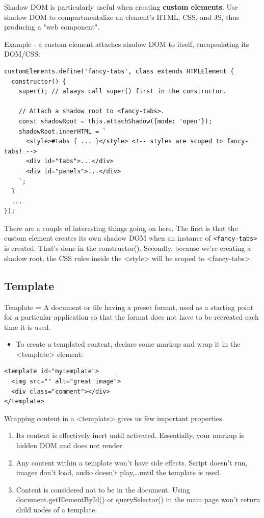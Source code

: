 \documentclass[11pt]{article}
\begin{document}
Shadow DOM is particularly useful when creating \textbf{custom elements}. Use shadow DOM to compartmentalize an element's HTML, CSS, and JS, thus producing a "web component".

Example - a custom element attaches shadow DOM to itself, encapsulating its DOM/CSS:
\lstset{breaklines=true,language=js,label= ,caption= ,captionpos=b,numbers=none}
\begin{lstlisting}
customElements.define('fancy-tabs', class extends HTMLElement {
  constructor() {
    super(); // always call super() first in the constructor.

    // Attach a shadow root to <fancy-tabs>.
    const shadowRoot = this.attachShadow({mode: 'open'});
    shadowRoot.innerHTML = `
      <style>#tabs { ... }</style> <!-- styles are scoped to fancy-tabs! -->
      <div id="tabs">...</div>
      <div id="panels">...</div>
    `;
  }
  ...
});
\end{lstlisting}
There are a couple of interesting things going on here. The first is that the custom element creates its own shadow DOM when an instance of \texttt{<fancy-tabs>} is created. That's done in the constructor(). Secondly, because we're creating a shadow root, the CSS rules inside the <style> will be scoped to <fancy-tabs>.

\subsection{Template}
\label{sec:org2380e31}
Template = A document or file having a preset format, used as a starting point for a particular application so that the format does not have to be recreated each time it is used.
\begin{itemize}
\item To create a templated content, declare some markup and wrap it in the <template> element:
\end{itemize}
\lstset{breaklines=true,language=HTML,label= ,caption= ,captionpos=b,numbers=none}
\begin{lstlisting}
<template id="mytemplate">
  <img src="" alt="great image">
  <div class="comment"></div>
</template>
\end{lstlisting}
Wrapping content in a <template> gives us few important properties.
\begin{enumerate}
\item Its content is effectively inert until activated. Essentially, your markup is hidden DOM and does not render.
\item Any content within a template won't have side effects. Script doesn't run, images don't load, audio doesn't play,\ldots{}until the template is used.
\item Content is considered not to be in the document. Using document.getElementById() or querySelector() in the main page won't return child nodes of a template.
\end{enumerate}
\end{document}
